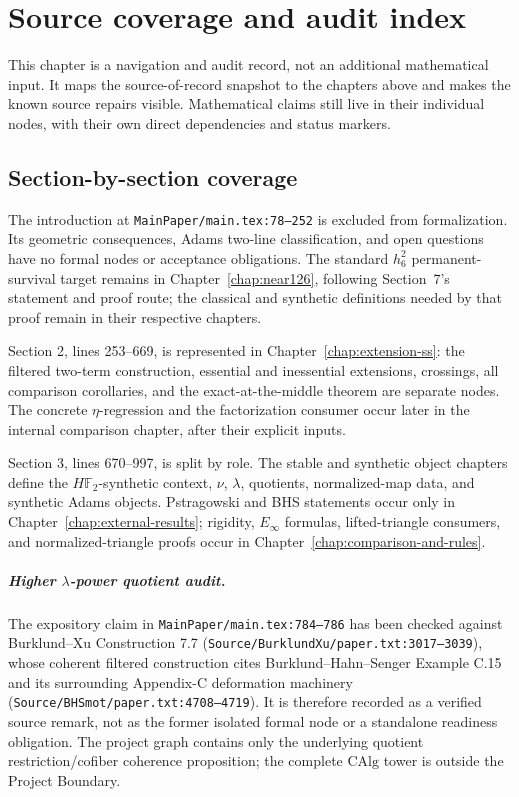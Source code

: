 \chapter{Source coverage and audit index}
\label{chap:coverage-audit}

This chapter is a navigation and audit record, not an additional mathematical
input.  It maps the source-of-record snapshot to the chapters above and makes
the known source repairs visible.  Mathematical claims still live in their
individual nodes, with their own direct dependencies and status markers.

\section{Section-by-section coverage}

The introduction at \texttt{MainPaper/main.tex:78--252} is excluded from
formalization. Its geometric consequences, Adams two-line classification,
and open questions have no formal nodes or acceptance obligations. The
standard $h_6^2$ permanent-survival target remains in
Chapter~\ref{chap:near126}, following Section~7's statement and proof route;
the classical and synthetic definitions needed by that proof remain in their
respective chapters.

Section 2, lines 253--669, is represented in
Chapter~\ref{chap:extension-ss}: the filtered two-term construction,
essential and inessential extensions, crossings, all comparison corollaries,
and the exact-at-the-middle theorem are separate nodes.  The concrete
$\eta$-regression and the factorization consumer occur later in the internal
comparison chapter, after their explicit inputs.

Section 3, lines 670--997, is split by role.  The stable and synthetic object
chapters define the $H\mathbb F_2$-synthetic context, $\nu$, $\lambda$,
quotients, normalized-map data, and synthetic Adams objects.  Pstragowski and
BHS statements occur only in Chapter~\ref{chap:external-results}; rigidity,
$E_\infty$ formulas, lifted-triangle consumers, and normalized-triangle proofs
occur in Chapter~\ref{chap:comparison-and-rules}.

\paragraph{Higher $\lambda$-power quotient audit.}
The expository claim in \texttt{MainPaper/main.tex:784--786} has been checked
against Burklund--Xu Construction 7.7
(\texttt{Source/BurklundXu/paper.txt:3017--3039}), whose coherent filtered
construction cites Burklund--Hahn--Senger Example C.15 and its surrounding
Appendix-C deformation machinery (\texttt{Source/BHSmot/paper.txt:4708--4719}).
It is therefore recorded as a verified source remark, not as the former
isolated formal node or a standalone readiness obligation.  The project graph
contains only the underlying quotient restriction/cofiber coherence proposition;
the complete $\mathrm{CAlg}$ tower is outside the Project Boundary.

